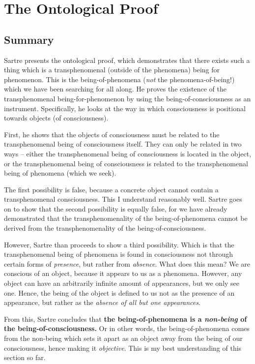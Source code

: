 \section{The Ontological Proof}
\subsection*{Summary}
Sartre presents the ontological proof, which demonstrates that there exists such a thing which is a transphenomenal (outside of the phenomena) being for phenomenon. This is the being-of-phenomena (\emph{not} the phenomena-of-being!) which we have been searching for all along. He proves the existence of the transphenomenal being-for-phenomenon by using the being-of-consciousness as an instrument. Specifically, he looks at the way in which consciousness is positional towards objects (of consciousness).

First, he shows that the objects of consciousness must be related to the transphenomenal being of consciousness itself. They can only be related in two ways -- either the transphenomenal being of consciousness is located in the object, or the transphenomenal being of consciousness is related to the transphenomenal being of phenomena (which we seek).

The first possibility is false, because a concrete object cannot contain a transphenomenal consciousness. This I understand reasonably well. Sartre goes on to show that the second possibility is equally false, for we have already demonstrated that the transphenomenality of the being-of-phenomena cannot be derived from the transphenomenality of the being-of-consciousness.

However, Sartre than proceeds to show a third possibility. Which is that the transphenomenal being of phenomena is found in consciousness not through certain forms of \emph{presence}, but rather from \emph{absence}. What does this mean? We are conscious of an object, because it appears to us as a phenomena. However, any object can have an arbitrarily infinite amount of appearances, but we only see one. Hence, the being of the object is defined to us not as the presence of an appearance, but rather as the \emph{absence of all but one appearances}.

From this, Sartre concludes that \textbf{the being-of-phenomena is a \emph{non-being} of the being-of-consciousness.} Or in other words, the being-of-phenomena comes from the non-being which sets it apart as an object away from the being of our consciousness, hence making it \emph{objective}. This is my best understanding of this section so far.

